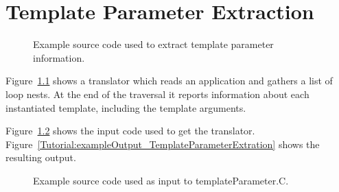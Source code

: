 \chapter{Template Parameter Extraction}

\begin{figure}[!h]
{\indent
{\mySmallFontSize

\begin{latexonly}
   
\end{latexonly}

\begin{htmlonly}
   
\end{htmlonly}

}
}
\caption{Example source code used to extract template parameter information.}
\label{Tutorial:exampleTemplateParameterExtration}
\end{figure}

   Figure~\ref{Tutorial:exampleTemplateParameterExtration} shows a translator which
reads an application and gathers a list of loop nests.  At the end of the traversal it
reports information about each instantiated template, including the template arguments.

   Figure~\ref{Tutorial:exampleInputCode_TemplateParameterExtration} shows the
input code used to get the translator.
Figure~\ref{Tutorial:exampleOutput_TemplateParameterExtration} shows the resulting output.

\begin{figure}[!h]
{\indent
{\mySmallFontSize

\begin{latexonly}
   
\end{latexonly}

\begin{htmlonly}
   
\end{htmlonly}

}
}
\caption{Example source code used as input to templateParameter.C.}
\label{Tutorial:exampleInputCode_TemplateParameterExtration}
\end{figure}

